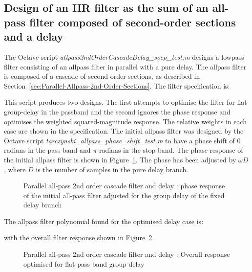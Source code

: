 \documentclass[a4paper,twoside,10pt,english]{report}
\begin{document}
\subsection{\label{sec:Parallel-Allpass-2nd-Order-Sections-Delay}Design of an IIR filter as the sum of an all-pass filter composed of second-order sections and a delay}
The Octave script \emph{allpass2ndOrderCascadeDelay\_socp\_test.m} designs a 
lowpass filter consisting of an allpass filter in parallel with a pure delay. 
The allpass filter is composed of a cascade of second-order sections, as 
described in Section~\ref{sec:Parallel-Allpass-2nd-Order-Sections}. The filter
specification is:
\begin{small}

\end{small}
This script produces two designs. The first attempts to optimise the filter for
flat group-delay in the passband and the second ignores the phase response
and optimises the weighted squared-magnitude response. The relative weights in
each case are shown in the specification. The initial allpass filter was 
designed by the Octave script \emph{tarczynski\_allpass\_phase\_shift\_test.m} to
have a phase shift of $0$ radians in the pass band and $\pi$ radians in the stop
band. The phase response of the initial allpass filter is shown in 
Figure~\ref{fig:Allpass-2nd-order-cascade-delay-initial-phase-response}. The
phase has been adjusted by $\omega{}D$, where $D$ is the number of samples
in the pure delay branch.
\begin{figure}[!htbp]
\begin{center}
\scalebox{0.7}{}
\caption{Parallel all-pass 2nd order cascade filter and delay : phase response
  of the initial all-pass filter adjusted for the group delay of the fixed
  delay branch}
\label{fig:Allpass-2nd-order-cascade-delay-initial-phase-response}
\end{center}
\end{figure}

The allpass filter polynomial found for the optimised delay case is:
\begin{small}

\end{small}
with the overall filter response shown in 
Figure~\ref{fig:Allpass-2nd-order-cascade-delay-flat-delay-response}.
\begin{figure}[!htbp]
\begin{center}
\scalebox{0.7}{}
\caption{Parallel all-pass 2nd order cascade filter and delay : Overall response optimised for flat pass band group delay}
\label{fig:Allpass-2nd-order-cascade-delay-flat-delay-response}
\end{center}
\end{figure}
\end{document}

